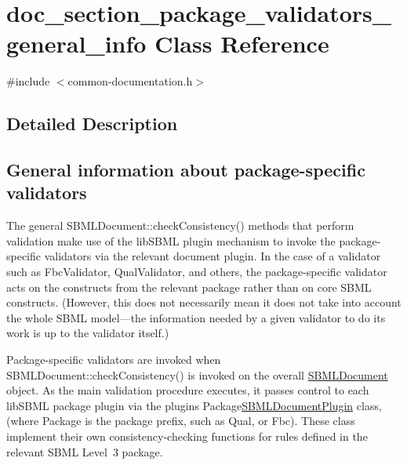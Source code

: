 \hypertarget{classdoc__section__package__validators__general__info}{}\section{doc\+\_\+section\+\_\+package\+\_\+validators\+\_\+general\+\_\+info Class Reference}
\label{classdoc__section__package__validators__general__info}


{\ttfamily \#include $<$common-\/documentation.\+h$>$}



\subsection{Detailed Description}
\hypertarget{classdoc__section__package__validators__general__info_general-pkg-validators}{}\subsection{General information about package-\/specific validators}\label{classdoc__section__package__validators__general__info_general-pkg-validators}
The general S\+B\+M\+L\+Document\+::check\+Consistency() methods that perform validation make use of the lib\+S\+B\+ML plugin mechanism to invoke the package-\/specific validators via the relevant document plugin. In the case of a validator such as Fbc\+Validator, Qual\+Validator, and others, the package-\/specific validator acts on the constructs from the relevant package rather than on core S\+B\+ML constructs. (However, this does not necessarily mean it does not take into account the whole S\+B\+ML model---the information needed by a given validator to do its work is up to the validator itself.)

Package-\/specific validators are invoked when S\+B\+M\+L\+Document\+::check\+Consistency() is invoked on the overall \hyperlink{class_s_b_m_l_document}{S\+B\+M\+L\+Document} object. As the main validation procedure executes, it passes control to each lib\+S\+B\+ML package plugin via the plugin\textquotesingle{}s {\ttfamily Package\hyperlink{class_s_b_m_l_document_plugin}{S\+B\+M\+L\+Document\+Plugin}} class, (where {\ttfamily Package} is the package prefix, such as {\ttfamily Qual}, or {\ttfamily Fbc}). These class implement their own consistency-\/checking functions for rules defined in the relevant S\+B\+ML Level~3 package.

